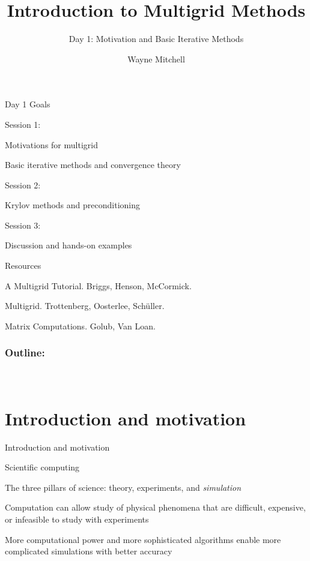 \documentclass[18pt,xcolor=table]{beamer}
\title[Multigrid]{Introduction to Multigrid Methods}
\subtitle{Day 1: Motivation and Basic Iterative Methods}
\author[Mitchell]{Wayne Mitchell}
\institute{\pgfuseimage{logo}\\Universit\"at Heidelberg\\Institut f\"ur Technische Informatik}
\date[]{\alert{}}
\begin{document}


\DeclareRobustCommand{\Chi}{\raisebox{2pt}{$\chi$}}

\begin{frame}{}
\begin{block}{Day 1 Goals}
\bit
\item Session 1:
\bit
\item Motivations for multigrid
\item Basic iterative methods and convergence theory
\eit
\item Session 2:
\bit
\item Krylov methods and preconditioning
\eit
\item Session 3:
\bit
\item Discussion and hands-on examples
\eit
\eit
\end{block}
\end{frame}

\begin{frame}{}
\begin{block}{Resources}
\bit
\item A Multigrid Tutorial. Briggs, Henson, McCormick.
\item Multigrid. Trottenberg, Oosterlee, Sch\"uller.
\item Matrix Computations. Golub, Van Loan.
\eit
\end{block}
\end{frame}

\begin{frame}
\frametitle{\bf Outline:}
\framesubtitle{~~}
\tableofcontents
\end{frame}


\section{Introduction and motivation}


\begin{frame}{Introduction and motivation}
\begin{block}{Scientific computing}
\bit
\item The three pillars of science: theory, experiments, and \emph{simulation}
\item Computation can allow study of physical phenomena that are difficult, expensive, or infeasible to study with experiments
\item More computational power and more sophisticated algorithms enable more complicated simulations with better accuracy
\eit
\end{block}
\end{frame}
\end{document}
